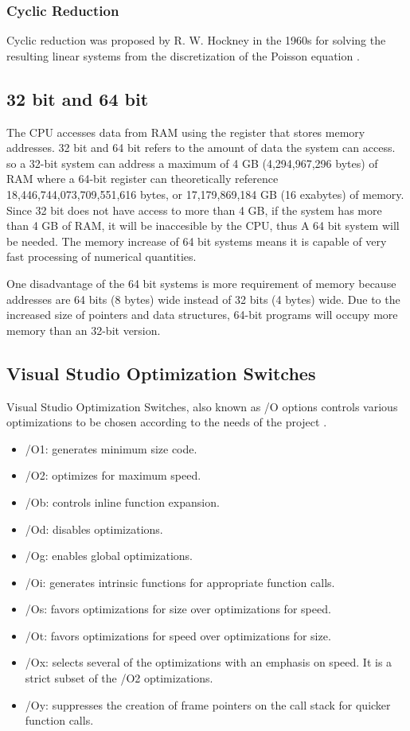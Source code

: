 \documentclass[12pt, oneside]{book}
\theoremstyle{plain}
\theoremstyle{definition}
\begin{document}
 \subsubsection{Cyclic Reduction}
Cyclic reduction was proposed by R. W. Hockney in the 1960s for solving the resulting linear systems from the  discretization of the Poisson equation \cite{Hockney}. 

\subsection{32 bit and 64 bit}

The CPU accesses data from RAM using the register that stores memory addresses. 32 bit and 64 bit refers to the amount of data the system can access. so a 32-bit system can address a maximum of 4 GB (4,294,967,296 bytes) of RAM where a 64-bit register can theoretically reference 18,446,744,073,709,551,616 bytes, or 17,179,869,184 GB (16 exabytes) of memory. Since 32 bit does not have access to more than 4 GB, if the system has more than 4 GB of RAM, it will be inaccesible by the CPU, thus A 64 bit system will be needed. The memory increase of 64 bit systems means it is capable of very fast processing of numerical quantities.

One disadvantage of the 64 bit systems is more requirement of memory because addresses are 64 bits (8 bytes) wide instead of 32 bits (4 bytes) wide. Due to the increased size of pointers and data structures, 64-bit programs will occupy more memory than an 32-bit version.

\subsection{Visual Studio Optimization Switches}
Visual Studio Optimization Switches, also known as /O options controls various optimizations to be chosen according to the needs of the project \cite{vsopt}.

\begin{itemize}
\item /O1: generates minimum size code.
\item /O2: optimizes for maximum speed.
\item /Ob: controls inline function expansion.
\item /Od: disables optimizations.
\item /Og: enables global optimizations.
\item /Oi: generates intrinsic functions for appropriate function calls.
\item /Os: favors optimizations for size over optimizations for speed.
\item /Ot: favors optimizations for speed over optimizations for size.
\item /Ox: selects several of the optimizations with an emphasis on speed. It is a strict subset of the /O2 optimizations.
\item /Oy: suppresses the creation of frame pointers on the call stack for quicker function calls. 
\end{itemize}
\end{document}
